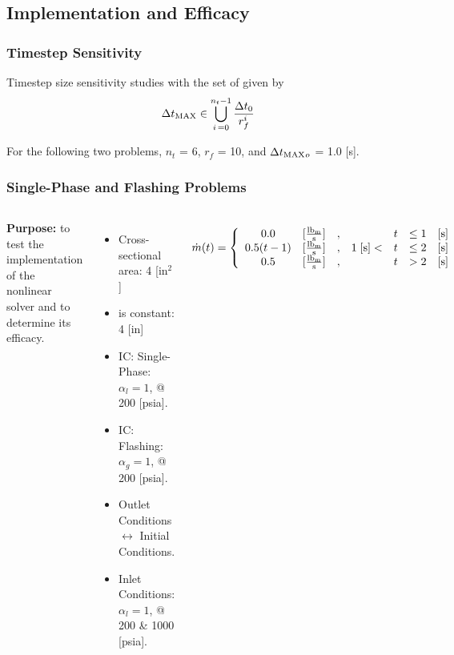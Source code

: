 \documentclass[compress,xcolor=table]{beamer}
\begin{document}
\subsection[Implementation \& Efficacy]{Implementation and Efficacy}
\begin{frame}
\frametitle{Timestep Sensitivity}

Timestep size sensitivity studies with the set of \dtmax{} given by
\begin{equation*}
\dtmax{} \in \bigcup^{n_{t}-1}_{i\, = 0} \frac{\dt{}_{0}}{r^{i}_{f}}
\end{equation*}

For the following two problems, $n_{t}$ = 6, $r_{f}$ = 10, and $\dtmax{}_{o}$ = 1.0 [s]. 

\end{frame}
\begin{frame}
\frametitle{Single-Phase and Flashing Problems}
\begin{columns}

\textbf{Purpose:} to test the implementation of the nonlinear solver and to determine its efficacy.

\begin{itemize}
\item{Cross-sectional area: 4 [in$^2$]}
\item{\dx{} is constant: 4 [in]}
\item{IC: Single-Phase: $\alpha_{l} = 1$, @ 200 [psia].}
\item{IC: Flashing: $\alpha_{g}=1$, @ 200 [psia].}
\item{Outlet Conditions $\longleftrightarrow$ Initial Conditions.}
\item{Inlet Conditions: $\alpha_{l}=1$, @ 200 \& 1000 [psia].}
\end{itemize}
\begin{equation*}
\dot{m}(t) = \left\{
\begin{array}{cclrcll}
 0.0           & [\frac{ \lbm{} }{\text{s}}] & , &                & t & \leq 1 & [\text{s}] \\
 0.5 ( t - 1)  & [\frac{ \lbm{} }{\text{s}}] & , & 1\; [\text{s}] < & t & \leq 2 & [\text{s}] \\
 0.5           & [\frac{ \lbm{} }{\text{s}}] & , &                & t & > 2    & [\text{s}]
\end{array}\right.
\end{equation*}

\begin{figure}[h!t]
\centering
\resizebox{\textwidth}{0.6\textheight}{

}

\end{figure}
\end{columns}
\end{frame}
\end{document}
